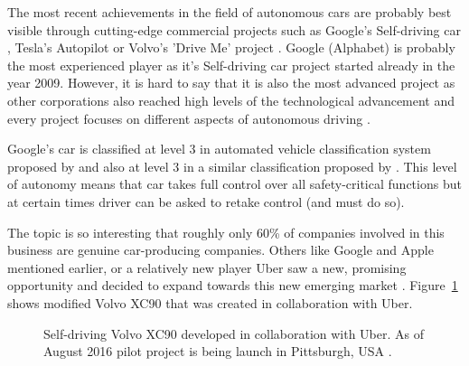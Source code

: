 \documentclass[11pt,english]{article}
\begin{document}
\par
The most recent achievements in the field of autonomous cars are probably best visible through cutting-edge commercial projects such as Google's Self-driving car \citep{google1}, Tesla's Autopilot \citep{tesla1} or Volvo's 'Drive Me' project \citep{volvo1}. Google (Alphabet) is probably the most experienced player as it's Self-driving car project started already in the year 2009. However, it is hard to say  that it is also the most advanced project as other corporations also reached high levels of the technological advancement and every project focuses on different aspects of autonomous driving \citep{33comp}. 
\par
Google's car is classified at level 3 in automated vehicle classification system proposed by \citet{nhtsa1} and also at level 3 in a similar classification proposed by \citet{sae1}. This level of autonomy means that car takes full control over all safety-critical functions but at certain times driver can be asked to retake control (and must do so).  
\par
The topic is so interesting that roughly only 60\% of companies involved in this business are genuine car-producing companies. Others like Google and Apple mentioned earlier, or a relatively new player Uber saw a new, promising opportunity and decided to expand towards this new emerging market \citep{33comp}. Figure~\ref{fig:volvo} shows modified Volvo XC90 that was created in collaboration with Uber.

\begin{figure}[!] %
\caption{Self-driving Volvo XC90 developed in collaboration with Uber. As of August 2016 pilot project is being launch in Pittsburgh, USA \citep{uberpittsburgh}.}
\label{fig:volvo}
\end{figure} 
\end{document}
